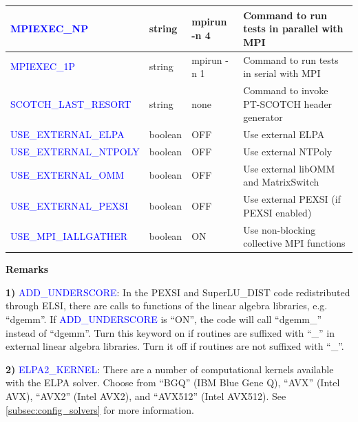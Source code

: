 \documentclass{report}
\begin{document}
\begin{tabular}[]{|p{50mm}|p{15mm}|p{20mm}|p{80mm}|}
\hline
\textcolor{blue}{MPIEXEC\_NP}                & string  & mpirun -n 4 & Command to run tests in parallel with MPI\\
\hline
\textcolor{blue}{MPIEXEC\_1P}                & string  & mpirun -n 1 & Command to run tests in serial with MPI\\
\hline
\textcolor{blue}{SCOTCH\_LAST\_RESORT}       & string  & none        & Command to invoke PT-SCOTCH header generator\\
\hline
\textcolor{blue}{USE\_EXTERNAL\_ELPA}        & boolean & OFF         & Use external ELPA\\
\hline
\textcolor{blue}{USE\_EXTERNAL\_NTPOLY}      & boolean & OFF         & Use external NTPoly\\
\hline
\textcolor{blue}{USE\_EXTERNAL\_OMM}         & boolean & OFF         & Use external libOMM and MatrixSwitch\\
\hline
\textcolor{blue}{USE\_EXTERNAL\_PEXSI}       & boolean & OFF         & Use external PEXSI (if PEXSI enabled)\\
\hline
\textcolor{blue}{USE\_MPI\_IALLGATHER}       & boolean & ON          & Use non-blocking collective MPI functions\\
\hline
\end{tabular}

\textbf{Remarks}

\textbf{1)} \textcolor{blue}{ADD\_UNDERSCORE}:  In the PEXSI and SuperLU\_DIST code redistributed through ELSI, there are calls to functions of the linear algebra libraries, e.g. ``dgemm''.  If \textcolor{blue}{ADD\_UNDERSCORE} is ``ON'', the code will call ``dgemm\_'' instead of ``dgemm''.  Turn this keyword on if routines are suffixed with ``\_'' in external linear algebra libraries.  Turn it off if routines are not suffixed with ``\_''.

\textbf{2)} \textcolor{blue}{ELPA2\_KERNEL}:  There are a number of computational kernels available with the ELPA solver.  Choose from ``BGQ'' (IBM Blue Gene Q), ``AVX'' (Intel AVX), ``AVX2'' (Intel AVX2), and ``AVX512'' (Intel AVX512).  See \ref{subsec:config_solvers} for more information.
\end{document}
